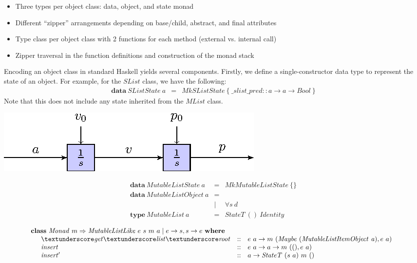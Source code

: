 \documentclass[runningheads,a4paper]{llncs}
\begin{document}
\begin{itemize}
\item Three types per object class: data, object, and state monad
\item Different ``zipper'' arrangements depending on base/child, abstract, and final attributes
\item Type class per object class with 2 functions for each method (external vs. internal call)
\item Zipper traversal in the function definitions and construction of the monad stack
\end{itemize}

Encoding an object class in standard Haskell yields several components. Firstly, we define a single-constructor data type to represent the state of an object. For example, for the $\mathit{SList}$ class, we have the following:
\begin{displaymath}
\begin{array}{lcl}
\mathbf{data}~\mathit{SListState}~a & = & \mathit{MkSListState}~\{~ \_ slist \_ pred :: a \to a \to \mathit{Bool}~\}
\end{array}
\end{displaymath}
Note that this does not include any state inherited from the $\mathit{MList}$ class.




\includegraphics{images/figures-figure0.eps}

\begin{displaymath}
\begin{array}{lcl}
\mathbf{data}~\mathit{MutableListState}~a & = & \mathit{MkMutableListState}~\{  \} \\
\mathbf{data}~\mathit{MutableListObject}~a & = & \\
 & \mid & \forall s~d\\
\mathbf{type}~\mathit{MutableList}~a & = & \mathit{StateT}~()~\mathit{Identity}
\end{array}
\end{displaymath}

\begin{displaymath}
\begin{array}{l}
\mathbf{class}~\mathit{Monad}~m \Rightarrow \mathit{MutableListLike}~e~s~m~a \mid e \to s, s \to e~\mathbf{where} \\
\quad \begin{array}{lcl}
\mathit{\textunderscore get \textunderscore list \textunderscore root} & :: & e~a \to m~(\mathit{Maybe}~(\mathit{MutableListItemObject~a}),e~a) \\
\mathit{insert} & :: & e~a \to a \to m~((),e~a) \\
\mathit{insert}' & :: & a \to \mathit{StateT}~(s~a)~m~()
\end{array}
\end{array}
\end{displaymath}
\end{document}

